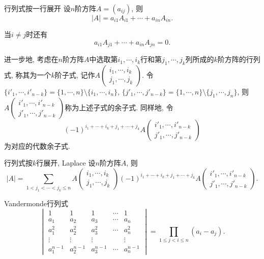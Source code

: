 \begin{theorem}{行列式按一行展开}
	设$n$阶方阵$A=(a_{ij})$, 则$$|A| = a_{i1}A_{i1} + \cdots + a_{in}A_{in}. $$
\end{theorem}
\begin{remark}
	当$i \neq j$时还有$$a_{i1}A_{j1} + \cdots + a_{in}A_{jn}=0. $$
\end{remark}

进一步地, 考虑在$n$阶方阵$A$中选取第$i_1,\cdots ,i_k$行和第$j_1,\cdots ,j_k$列所成的$k$阶方阵的行列式, 称其为一个$k$阶子式, 记作$\displaystyle A \begin{pmatrix}
	i_1,\cdots ,i_k \\ j_1,\cdots ,j_k
\end{pmatrix}$. 令$\{ i'_1,\cdots ,i'_{n-k} \}=\{ 1,\cdots ,n \} \setminus \{ i_1,\cdots ,i_n \}$, $\{ j'_1,\cdots ,j'_{n-k} \}=\{ 1,\cdots ,n \} \setminus \{ j_1,\cdots ,j_n \}$, 则$\displaystyle A \begin{pmatrix}
	i'_1,\cdots ,i'_{n-k} \\ j'_1,\cdots ,j'_{n-k}
\end{pmatrix}$称为上述子式的余子式. 同样地, 令$$(-1)^{i_1+\cdots +i_k+j_1+\cdots +j_k} A \begin{pmatrix}
	i'_1,\cdots ,i'_{n-k} \\ j'_1,\cdots ,j'_{n-k}
\end{pmatrix}$$为对应的代数余子式. 

\begin{theorem}{行列式按$k$行展开, Laplace}
	设$n$阶方阵$A$, 则$$|A| = \sum_{1<j_1<\cdots <j_k \leq n} A\begin{pmatrix}
	i_1,\cdots ,i_k \\ j_1,\cdots ,j_k
\end{pmatrix} (-1)^{i_1+\cdots +i_k+j_1+\cdots +j_k} A \begin{pmatrix}
	i'_1,\cdots ,i'_{n-k} \\ j'_1,\cdots ,j'_{n-k}
\end{pmatrix}.$$
\end{theorem}

\begin{proposition}{Vandermonde行列式}
	$$\begin{vmatrix}
 1 & 1 & 1 & \cdots & 1\\
 a_1 & a_2 & a_3 & \cdots & a_n\\
 a_1^2 & a_2^2 & a_3^2 & \cdots & a_n^2\\
 \vdots & \vdots & \vdots &  & \vdots \\
 a_1^{n-1} & a_2^{n-1} & a_3^{n-1} & \cdots & a_n^{n-1}
\end{vmatrix} = \prod_{1 \leq j < i \leq n} (a_i-a_j).$$
\end{proposition}

